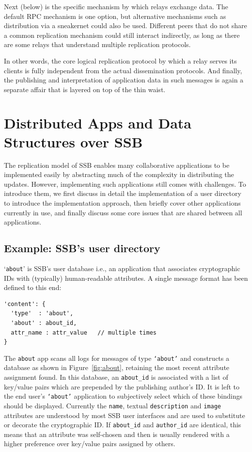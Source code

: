 \documentclass[9pt,sigconf]{acmart}
\begin{document}
Next (below) is the specific mechanism by which relays exchange
data. The default RPC mechanism is one option, but alternative
mechanisms such as distribution via a sneakernet could also be
used. Different peers that do not share a common replication mechanism
could still interact indirectly, as long as there are some relays that
understand multiple replication protocols.

In other words, the core logical replication protocol by which a relay
serves its clients is fully independent from the actual dissemination
protocols. And finally, the publishing and interpretation of
application data in such messages is again a separate affair that is
layered on top of the thin waist.



\section{Distributed Apps and Data Structures over SSB}
\label{sect:apps}

The replication model of SSB enables many collaborative applications
to be implemented easily by abstracting much of the complexity in
distributing the updates. However, implementing such applications
still comes with challenges. To introduce them, we first discuss in
detail the implementation of a user directory to introduce the
implementation approach, then briefly cover other applications
currently in use, and finally discuss some core issues that are shared
between all applications.

\subsection{Example: SSB's user directory}
\label{ssect:about}

`{\small\tt about}' is SSB's user database i.e., an application that
associates cryptographic IDs with (typically) human-readable
attributes. A single message format has been defined to this end:
%
{\small\begin{verbatim}
'content': {
  'type'  : 'about',
  'about' : about_id,
  attr_name : attr_value   // multiple times
}
\end{verbatim}}

\noindent
The {\small\tt about} app scans all logs for messages of type
{\small\tt `about'} and constructs a database as shown in
Figure~\ref{fig:about}, retaining the most recent attribute assignment
found. In this database, an {\small\tt about\_id} is associated with a
list of key/value pairs which are prepended by the publishing author's
ID. It is left to the end user's {\small\tt `about'} application to
subjectively select which of these bindings should be displayed.
%
Currently the {\small\tt name}, textual {\small\tt description} and
{\small\tt image} attributes are understood by most SSB user
interfaces and are used to substitute or decorate the cryptographic
ID. If {\small\tt about\_id} and {\small\tt author\_id} are identical,
this means that an attribute was self-chosen and then is usually
rendered with a higher preference over key/value pairs assigned by
others.
\end{document}
